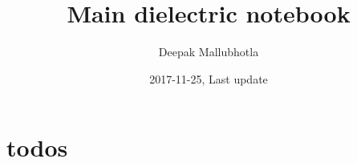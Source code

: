 \documentclass[11pt]{article}
\title{Main dielectric notebook}
\date{2017-11-25, Last update \DTMToday{}}
\author{Deepak Mallubhotla}
\newcommand{\onlyinsubfile}[1]{#1}
\newcommand{\notinsubfile}[1]{}
\begin{document}
\renewcommand{\onlyinsubfile}[1]{}
\renewcommand{\notinsubfile}[1]{#1}

\maketitle

\tableofcontents











\newpage
\section{todos}
\listoftodos
\end{document}
